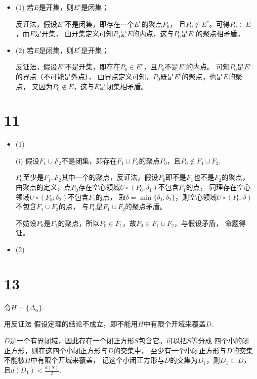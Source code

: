 \documentclass{article}
\begin{document}
\begin{itemize}
  \item (1) 若$E$是开集，则$E^c$是闭集；

        反证法，假设$E^c$不是闭集，即存在一个$E^c$的聚点$P_0$，
        且$P_0 \notin E^c$。可得$P_0 \in E$，而$E$是开集，
        由开集定义可知$P_0$是$E$的内点，这与$P_0$是$E^c$的聚点相矛盾。

  \item (2) 若$E$是闭集，则$E^c$是开集；

        反证法，假设$E^c$不是开集，即存在$P_0 \in E^c$，且$P_0$不是$E^c$的内点。
        可知$P_0$是$E^c$的界点（不可能是外点），
        由界点定义可知，$P_0$既是$E^c$的聚点，也是$E$的聚点，
        又因为$P_0 \notin E$，这与$E$是闭集相矛盾。
\end{itemize}

\section*{11}

\begin{itemize}
  \item (1)

        (i) 假设$F_1 \cup F_2$不是闭集，即存在$F_1 \cup F_2$的聚点$P_0$，且$P_0 \notin F_1 \cup F_2$.

        $P_0$至少是$F_1, F_2$其中一个的聚点，反证法，假设$P_0$即不是$F_1$也不是$F_2$的聚点，
        由聚点的定义，点$P_0$存在空心领域$U\circ(P_0; \delta_1)$不包含$F_1$的点，
        同理存在空心领域$U\circ(P_0; \delta_2)$不包含$F_1$的点，
        取$\delta = \min\{\delta_1, \delta_2\}$，则空心领域$U\circ(P_0; \delta)$不包含$F_1 \cup F_2$的点，
        与$P_0$是$F_1 \cup F_2$的聚点矛盾。

        不妨设$P_0$是$F_1$的聚点，所以$P_0 \in F_1$，故$P_0 \in F_1 \cup F_2$，与假设矛盾，
        命题得证。

  \item (2)
\end{itemize}

\section*{13}
令$H = \{\Delta_{\alpha}\}$.

用反证法 假设定理的结论不成立，即不能用$H$中有限个开域来覆盖$D$.

$D$是一个有界闭域，因此存在一个闭正方形$S$包含它。可以把$S$等分成
四个小的闭正方形，则在这四个小闭正方形与$D$的交集中，
至少有一个小闭正方形与$D$的交集不能被$H$中有限个开域来覆盖，
记这个小闭正方形与$D$的交集为$D_1$，则$D_1 \subset D$，
且$d(D_1) < \frac{d(S)}{2}$.
\end{document}
